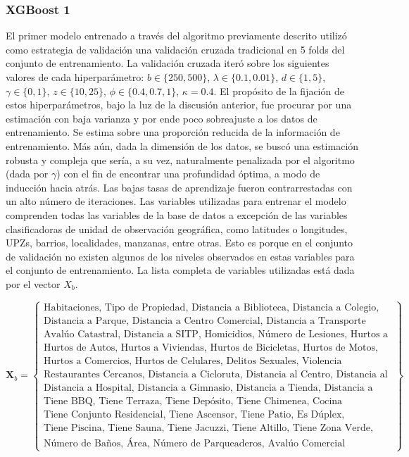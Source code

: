 \documentclass[article,11 pt]{article}
\begin{document}
\subsubsection{XGBoost 1}
El primer modelo entrenado a través del algoritmo previamente descrito utilizó como estrategia de validación una validación cruzada tradicional en 5 folds del conjunto de entrenamiento. La validación cruzada iteró sobre los siguientes valores de cada hiperparámetro: $b \in \{250, 500\}$, $\lambda \in \{0.1, 0.01\}$, $d \in \{1, 5\}$, $\gamma \in \{0, 1\}$, $z \in \{10, 25\}$, $\phi \in \{0.4, 0.7, 1\}$, $\kappa = 0.4$.
 El propósito de la fijación de estos hiperparámetros, bajo la luz de la discusión anterior, fue procurar por una estimación con baja varianza y por ende poco sobreajuste a los datos de entrenamiento. Se estima sobre una proporción reducida de la información de entrenamiento. Más aún, dada la dimensión de los datos, se buscó una estimación robusta y compleja que sería, a su vez, naturalmente penalizada por el algoritmo (dada por $\gamma$) con el fin de encontrar una profundidad óptima, a modo de inducción hacia atrás. Las bajas tasas de aprendizaje fueron contrarrestadas con un alto número de iteraciones. Las variables utilizadas para entrenar el modelo comprenden todas las variables de la base de datos a excepción de las variables clasificadoras de unidad de observación geográfica, como latitudes o longitudes, UPZs, barrios, localidades, manzanas, entre otras. Esto es porque en el conjunto de validación no existen algunos de los niveles observados en estas variables para el conjunto de entrenamiento. La lista completa de variables utilizadas está dada por el vector ${X}_b$.

\[
\mathbf{X}_b = \left\{
\begin{array}{l}
\text{Habitaciones, Tipo de Propiedad, Distancia a Biblioteca, Distancia a Colegio, Distancia a Museo,} \\
\text{Distancia a Parque, Distancia a Centro Comercial, Distancia a Transporte Público, Estrato,} \\
\text{Avalúo Catastral, Distancia a SITP, Homicidios, Número de Lesiones, Hurtos a Personas,} \\
\text{Hurtos de Autos, Hurtos a Viviendas, Hurtos de Bicicletas, Hurtos de Motos,} \\
\text{Hurtos a Comercios, Hurtos de Celulares, Delitos Sexuales, Violencia Intrafamiliar,} \\
\text{Restaurantes Cercanos, Distancia a Cicloruta, Distancia al Centro, Distancia al CAI,} \\
\text{Distancia a Hospital, Distancia a Gimnasio, Distancia a Tienda, Distancia a Farmacia,} \\
\text{Tiene BBQ, Tiene Terraza, Tiene Depósito, Tiene Chimenea, Cocina Americana,} \\
\text{Tiene Conjunto Residencial, Tiene Ascensor, Tiene Patio, Es Dúplex,} \\
\text{Tiene Piscina, Tiene Sauna, Tiene Jacuzzi, Tiene Altillo, Tiene Zona Verde,} \\
\text{Número de Baños, Área, Número de Parqueaderos, Avalúo Comercial}
\end{array}
\right\}
\]
\end{document}
